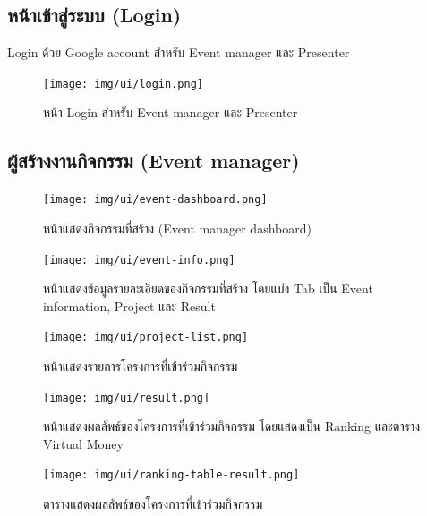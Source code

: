 \subsection{หน้าเข้าสู่ระบบ (Login)}
Login ด้วย Google account สำหรับ Event manager และ Presenter

\begin{figure}[h!] %
    \begin{center}
        \texttt{[image: img/ui/login.png]}
    \end{center}
    \caption{หน้า Login สำหรับ Event manager และ Presenter}
    \label{fig:login}
\end{figure}

\subsection{ผู้สร้างงานกิจกรรม (Event manager)}
\begin{figure}[h!] %
    \begin{center}
        \texttt{[image: img/ui/event-dashboard.png]}
    \end{center}
    \caption{หน้าแสดงกิจกรรมที่สร้าง (Event manager dashboard)}
    \label{fig:event-dashboard}
\end{figure}

\begin{figure}
    \begin{center}
        \texttt{[image: img/ui/event-info.png]}
    \end{center}
    \caption{หน้าแสดงข้อมูลรายละเอียดของกิจกรรมที่สร้าง โดยแบ่ง Tab เป็น Event information, Project และ Result}
    \label{fig:event-info}

    \begin{center}
        \texttt{[image: img/ui/project-list.png]}
    \end{center}
    \caption{หน้าแสดงรายการโครงการที่เข้าร่วมกิจกรรม}
    \label{fig:project-list}
\end{figure}

\begin{figure}[t]
    \begin{center}
        \texttt{[image: img/ui/result.png]}
    \end{center}
    \caption{หน้าแสดงผลลัพธ์ของโครงการที่เข้าร่วมกิจกรรม โดยแสดงเป็น Ranking และตาราง Virtual Money}
    \label{fig:result}

    \begin{center}
        \texttt{[image: img/ui/ranking-table-result.png]}
    \end{center}
    \caption{ตารางแสดงผลลัพธ์ของโครงการที่เข้าร่วมกิจกรรม}
    \label{fig:ranking-table-result}
\end{figure}

